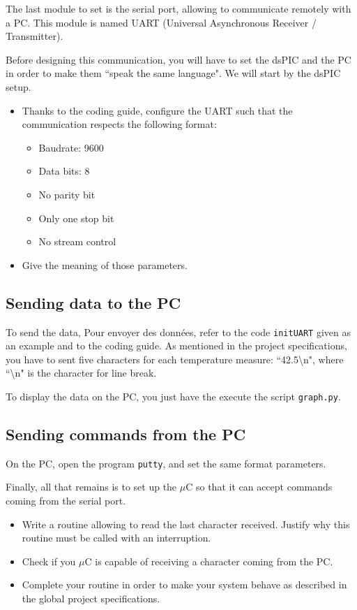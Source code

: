 \documentclass[11pt,a4paper]{article}
\theoremstyle{definition}%
\begin{document}
The last module to set is the serial port, allowing to communicate remotely with a PC.
This module is named UART (Universal Asynchronous Receiver / Transmitter).

Before designing this communication, you will have to set the dsPIC and the PC in order to make them ``speak the same language".
We will start by the dsPIC setup.

\begin{itemize}
	\item Thanks to the coding guide, configure the UART such that the communication respects the following format:
	\begin{itemize}
		\item Baudrate: 9600
		\item Data bits: 8
		\item No parity bit
		\item Only one stop bit
		\item No stream control
	\end{itemize}
	\item Give the meaning of those parameters.
\end{itemize}

\subsection{Sending data to the PC}
To send the data, 
Pour envoyer des données, refer to the code \texttt{initUART} given as an example and to the coding guide.
As mentioned in the project specifications, you have to sent five characters for each temperature measure: ``42.5\textbackslash n", where ``\textbackslash n" is the character for line break.

To display the data on the PC, you just have the execute the script \texttt{graph.py}.



\subsection{Sending commands from the PC}

On the PC, open the program \texttt{putty}, and set the same format parameters.


Finally, all that remains is to set up the $\mu$C so that it can accept commands coming from the serial port.
\begin{itemize}
	\item Write a routine allowing to read the last character received.
	Justify why this routine must be called with an interruption.
	\item Check if you $\mu$C is capable of receiving a character coming from the PC.
	\item Complete your routine in order to make your system behave as described in the global project specifications.
\end{itemize}
\end{document}
